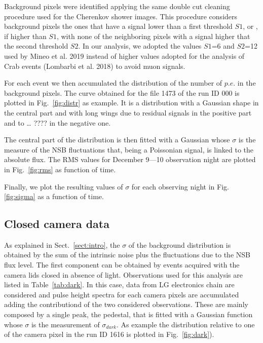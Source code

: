 Background pixels were identified applying the same double cut cleaning procedure used for the Cherenkov shower images. This procedure considers background pixels the ones that have a signal lower than a first threshold $S1$, or , if higher than $S1$, with none of the neighboring pixels with a signal higher that the second threshold $S2$. In our analysis, we adopted the values $S1$=6 and $S2$=12 used by Mineo et al. 2019 instead of higher values adopted for the analysis of Crab events (Lombarbi et al. 2018) to avoid muon signals.

For each event we then accumulated the distribution of the number of $p.e.$ in the background pixels. The curve obtained for the file 1473 of the run ID 000 is plotted in Fig.~\ref{fig:distr} as example. It is a distribution with a Gaussian shape in the central part and with long wings due to residual signals in the positive part and to … ???? in the negative one. 

The central part of the distribution is then fitted with a Gaussian whose $\sigma$ is the measure of the NSB fluctuations that, being a Poissonian signal, is linked to the absolute flux. The RMS values for December 9—10 observation night are plotted in Fig.~\ref{fig:rms} as function of time.

Finally, we plot the resulting values of $\sigma$ for each observing night in Fig.\ref{fig:sigma}  as a function of time. 


\subsection{Closed camera data} 

As explained in Sect.~\ref{sect:intro}, the $\sigma$ of the background distribution is obtained by the sum of the intrinsic noise plus the fluctuations due to the NSB flux level. The first component can be obtained by events acquired with the camera lids closed in absence of light.
Observations used for this analysis are listed in Table~\ref{tab:dark}. In this case, data from LG electronics chain are considered and pulse height spectra for each camera pixels are accumulated adding the contributiond of the two considered observations. These are mainly composed by a single peak, the pedestal, that is fitted with a Gaussian function whose $\sigma$ is the measurement of $\sigma_{dark}$. As example the distribution relative to one of the camera pixel in the run ID 1616 is plotted in Fig.~\ref{fig:dark}).


